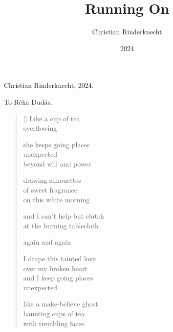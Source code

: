 \documentclass[14pt]{extbook}
\title{Running On}
\author{Christian Rinderknecht}
\date{\small 2024}
\newcommand*{\centeredornament}{\centerline{\pgfornament[width=6cm]{88}}}
\begin{document}


\thispagestyle{empty}

\maketitle

\thispagestyle{empty}

\vspace*{14cm}

\begin{flushright}
  \textcopyright{} Christian Rinderknecht, 2024.
\end{flushright}

\newpage

\vspace*{4cm}

\begin{flushright}
To Réka Dudás.
\end{flushright}

\thispagestyle{empty}


\newpage\leavevmode\thispagestyle{empty}\newpage



\newpage

\vspace*{-15mm}
\centeredornament
\vspace*{-7mm}


\settowidth{\versewidth}{Like a make-believe ghost}

\begin{verse}[\versewidth]
  Like a cup of tea \\
  overflowing

  she keeps going places \\
  unexpected \\
  beyond will and power

  drawing silhouettes \\
  of sweet fragrance \\
  on this white morning

  and I can't help but clutch \\
  at the burning tablecloth

  again and again

  I drape this tainted love \\
  over my broken heart \\
  and I keep going places \\
  unexpected

  like a make-believe ghost \\
  haunting cups of tea \\
  with trembling faces.
\end{verse}
\end{document}
